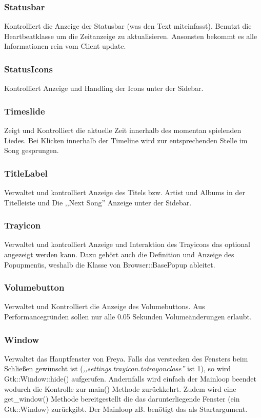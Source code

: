 \subsubsection{Statusbar}
Kontrolliert die Anzeige der Statusbar (was den Text miteinfasst). 
Benutzt die Heartbeatklasse um die Zeitanzeige zu aktualisieren. Ansonsten bekommt es alle Informationen rein vom Client update.

\subsubsection{StatusIcons}
Kontrolliert Anzeige und Handling der Icons unter der Sidebar.

\subsubsection{Timeslide}
Zeigt und Kontrolliert die aktuelle Zeit innerhalb des momentan spielenden Liedes.
Bei Klicken innerhalb der Timeline wird zur entsprechenden Stelle im Song gesprungen.

\subsubsection{TitleLabel}
Verwaltet und kontrolliert Anzeige des Titels bzw. Artist und Albums in der Titelleiste und Die ,,Next Song'' Anzeige unter der Sidebar.

\subsubsection{Trayicon}
Verwaltet und kontrolliert Anzeige und Interaktion des Trayicons das optional angezeigt werden kann.
Dazu gehört auch die Definition und Anzeige des Popupmenüs, weshalb die Klasse von Browser::BasePopup ableitet.

\subsubsection{Volumebutton}
Verwaltet und Kontrolliert die Anzeige des Volumebuttons. Aus Performancegründen sollen nur alle 0.05 Sekunden Volumeänderungen erlaubt.

\subsubsection{Window}
Verwaltet das Hauptfenster von Freya.
Falls das verstecken des Fensters beim Schließen gewünscht ist (\emph{,,settings.trayicon.totrayonclose''} ist 1), so wird Gtk::Window::hide() aufgerufen.
Andernfalls wird einfach der Mainloop beendet wodurch die Kontrolle zur main() Methode zurückkehrt.
Zudem wird eine get\_window() Methode bereitgestellt die das darunterliegende Fenster (ein Gtk::Window) zurückgibt.
Der Mainloop zB. benötigt das als Startargument.

